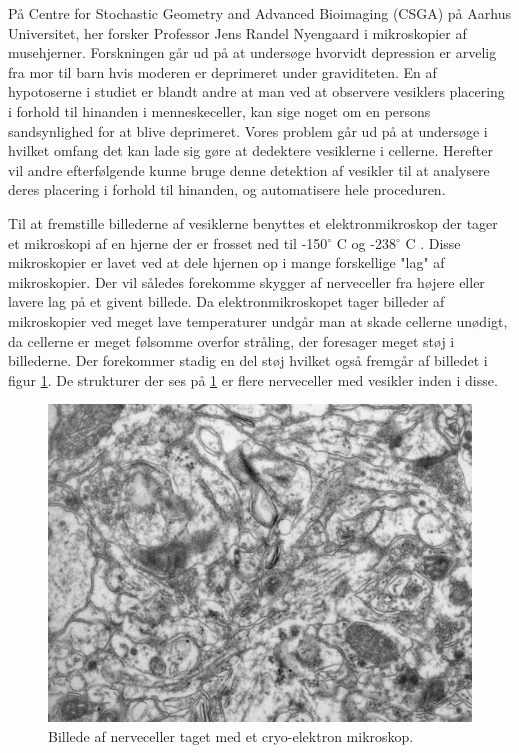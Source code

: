 På Centre for Stochastic Geometry and Advanced Bioimaging (CSGA) på Aarhus Universitet, her forsker Professor Jens Randel Nyengaard i mikroskopier af musehjerner. 
Forskningen går ud på at undersøge hvorvidt depression er arvelig fra mor til barn hvis moderen er deprimeret under graviditeten.
En af hypotoserne i studiet er blandt andre at man ved at observere vesiklers placering i forhold til hinanden i menneskeceller, kan sige noget om en persons sandsynlighed for at blive deprimeret.
Vores problem går ud på at undersøge i hvilket omfang det kan lade sig gøre at dedektere vesiklerne i cellerne.
Herefter vil andre efterfølgende kunne bruge denne detektion af vesikler til at analysere deres placering i forhold til hinanden, og automatisere hele proceduren.

Til at fremstille billederne af vesiklerne benyttes et elektronmikroskop der tager et mikroskopi af en hjerne der er frosset ned til -150$^\circ$ C og -238$^\circ$ C . Disse mikroskopier er lavet ved at dele hjernen op i mange forskellige "lag" af mikroskopier.
Der vil således forekomme skygger af nerveceller fra højere eller lavere lag på et givent billede.
Da elektronmikroskopet tager billeder af mikroskopier ved meget lave temperaturer undgår man at skade cellerne unødigt, da cellerne er meget følsomme overfor stråling, der foresager meget støj i billederne. Der forekommer stadig en del støj hvilket også fremgår af billedet i figur \ref{fig:intro_celler}.
De strukturer der ses på \ref{fig:intro_celler} er flere nerveceller med vesikler inden i disse. 
\begin{figure}[H]
	\centering
	\includegraphics[scale=0.5]{files/intro/img/celler.jpg}
	\caption{Billede af nerveceller taget med et cryo-elektron mikroskop.\label{fig:intro_celler}}
\end{figure}

